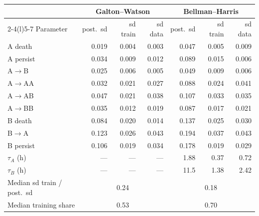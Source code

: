 \documentclass[10pt,a4paper]{article}
\newcommand{\tA}{$\tau_A$}
\newcommand{\tB}{$\tau_B$}
\newcommand{\blk}[1]{\par\needspace{5\baselineskip}\smallskip{\sffamily\bfseries\color{inkgray}#1}\par}
\newcommand{\Comment}{\blk{Comment}}
\begin{document}
\begin{center}\footnotesize
\begin{tabular}{@{}lrrrrrr@{}}\toprule
 & \multicolumn{3}{c}{Galton--Watson} & \multicolumn{3}{c}{Bellman--Harris} \\\cmidrule(lr){2-4}\cmidrule(l){5-7}
Parameter & post.\ sd & sd train & sd data & post.\ sd & sd train & sd data \\\midrule
A death & 0.019 & 0.004 & 0.003 & 0.047 & 0.005 & 0.009 \\
A persist & 0.034 & 0.009 & 0.012 & 0.089 & 0.015 & 0.006 \\
A$\to$B & 0.025 & 0.006 & 0.005 & 0.049 & 0.009 & 0.006 \\
A$\to$AA & 0.032 & 0.021 & 0.027 & 0.088 & 0.024 & 0.041 \\
A$\to$AB & 0.047 & 0.021 & 0.038 & 0.107 & 0.033 & 0.035 \\
A$\to$BB & 0.035 & 0.012 & 0.019 & 0.087 & 0.017 & 0.021 \\
B death & 0.084 & 0.020 & 0.014 & 0.137 & 0.025 & 0.030 \\
B$\to$A & 0.123 & 0.026 & 0.043 & 0.194 & 0.037 & 0.043 \\
B persist & 0.106 & 0.019 & 0.034 & 0.178 & 0.019 & 0.029 \\
\tA{} (h) & --- & --- & --- & 1.88 & 0.37 & 0.72 \\
\tB{} (h) & --- & --- & --- & 11.5 & 1.38 & 2.42 \\\midrule
Median sd train / post.\ sd & \multicolumn{3}{c}{0.24} & \multicolumn{3}{c}{0.18} \\
Median training share & \multicolumn{3}{c}{0.53} & \multicolumn{3}{c}{0.70} \\\bottomrule
\end{tabular}
\end{center}
\Comment
\end{document}
